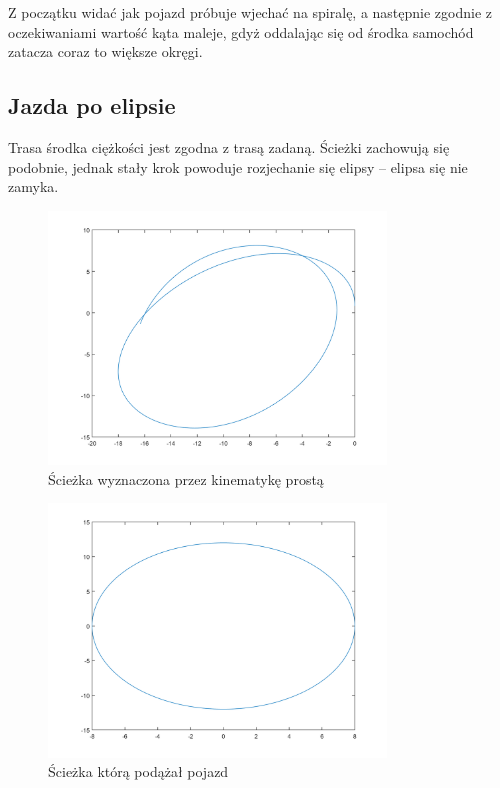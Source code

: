 \documentclass[a4paper, 12pt]{report}
\begin{document}
				\noindent Z początku widać jak pojazd próbuje wjechać na spiralę, a następnie zgodnie z oczekiwaniami wartość kąta maleje, gdyż oddalając się od środka samochód zatacza coraz to większe okręgi.
			\newpage
			\subsection{Jazda po elipsie}
				Trasa środka ciężkości jest zgodna z trasą zadaną. Ścieżki zachowują się podobnie, jednak stały krok powoduje rozjechanie się elipsy -- elipsa się nie zamyka.
				\begin{figure}[H]
					\centering
					\includegraphics[width = 0.8\textwidth]{./AP/img/rev/elipse_in_1.png}
					\caption{Ścieżka wyznaczona przez kinematykę prostą}
				\end{figure}
				\begin{figure}[H]
					\centering
					\includegraphics[width = 0.8\textwidth]{./AP/img/rev/elipse_in_2.png}
					\caption{Ścieżka którą podążał pojazd}
				\end{figure}
\end{document}
